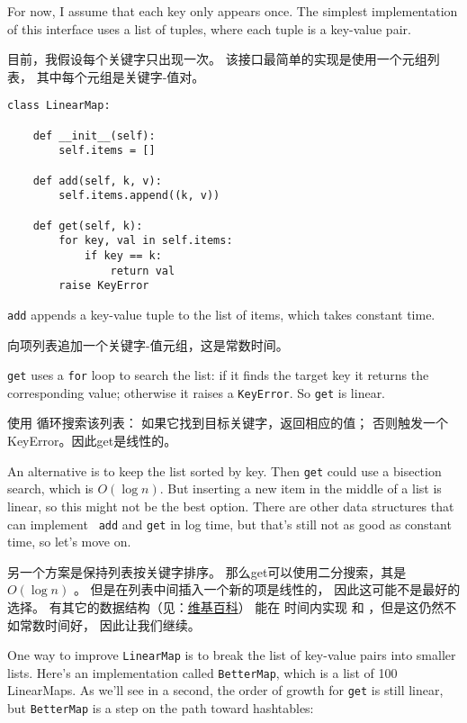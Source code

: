 For now, I assume that each key only appears once.
The simplest implementation of this interface uses a list of
tuples, where each tuple is a key-value pair.

目前，我假设每个关键字只出现一次。
该接口最简单的实现是使用一个元组列表， 其中每个元组是关键字-值对。

\begin{lstlisting}
class LinearMap:

    def __init__(self):
        self.items = []

    def add(self, k, v):
        self.items.append((k, v))

    def get(self, k):
        for key, val in self.items:
            if key == k:
                return val
        raise KeyError
\end{lstlisting}

{\tt add} appends a key-value tuple to the list of items, which
takes constant time.

 向项列表追加一个关键字-值元组，这是常数时间。

{\tt get} uses a {\tt for} loop to search the list:
if it finds the target key it returns the corresponding value;
otherwise it raises a {\tt KeyError}.
So {\tt get} is linear.

 使用  循环搜索该列表： 如果它找到目标关键字，返回相应的值；
否则触发一个KeyError。因此get是线性的。

An alternative is to keep the list sorted by key.  Then {\tt get}
could use a bisection search, which is $O(\log n)$.  But inserting a
new item in the middle of a list is linear, so this might not be the
best option.  There are other data structures that can implement {\tt
  add} and {\tt get} in log time, but that's still not as good as
constant time, so let's move on.

另一个方案是保持列表按关键字排序。
那么get可以使用二分搜索，其是 $O(\log n)$ 。
但是在列表中间插入一个新的项是线性的， 因此这可能不是最好的选择。
有其它的数据结构（见：\href{http://en.wikipedia.org/wiki/Red-black_tree}{维基百科}）
能在  时间内实现  和 ，但是这仍然不如常数时间好，
因此让我们继续。

One way to improve {\tt LinearMap} is to break the list of key-value
pairs into smaller lists.  Here's an implementation called
{\tt BetterMap}, which is a list of 100 LinearMaps.  As we'll see
in a second, the order of growth for {\tt get} is still linear,
but {\tt BetterMap} is a step on the path toward hashtables:


